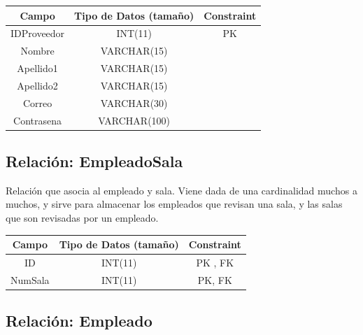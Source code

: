 \documentclass[12pt, fleqn]{report}                             %
\begin{document}
            \small{
            \begin{tabular}{| c | c | c |}
                \hline
                \textbf{Campo} & \textbf{Tipo de Datos (tamaño)} & \textbf{Constraint} \\[0.5ex] 
                \hline\hline
                
                IDProveedor & INT(11)       & PK                    \\
                Nombre      & VARCHAR(15)   &                       \\
                Apellido1   & VARCHAR(15)   &                       \\
                Apellido2   & VARCHAR(15)   &                       \\
                Correo      & VARCHAR(30)   &                       \\
                Contrasena  & VARCHAR(100)  &                       \\
                \hline
            \end{tabular}
            }


        \subsection*{Relación: EmpleadoSala}

            Relación que asocia al empleado y sala. Viene dada de una cardinalidad
            muchos a muchos, y sirve para almacenar los empleados que revisan una sala,
            y las salas que son revisadas por un empleado.

            \vspace{2em}

            \small{
            \begin{tabular}{| c | c | c |}
                \hline
                \textbf{Campo} & \textbf{Tipo de Datos (tamaño)} & \textbf{Constraint} \\[0.5ex] 
                \hline\hline
                
                ID          & INT(11)       & PK , FK               \\
                NumSala     & INT(11)       & PK, FK                \\
                \hline
            \end{tabular}
            }


        \clearpage
        \subsection*{Relación: Empleado}
\end{document}
